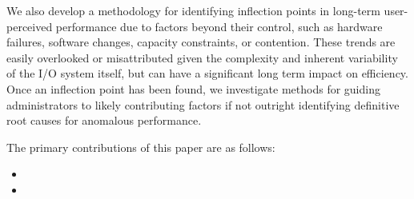 We also develop a methodology for identifying inflection points in
long-term user-perceived performance due to factors beyond their control,
such as hardware failures, software changes, capacity constraints, or
contention.  These trends are easily overlooked or misattributed given the
complexity and inherent variability of the I/O system itself, but can have a
significant long term impact on efficiency.  Once an inflection point has
been found, we investigate methods for guiding administrators to likely
contributing factors if not outright identifying definitive root causes for
anomalous performance.


The primary contributions of this paper are as follows:
\begin{itemize}
\item {}
\item {}
\end{itemize}

